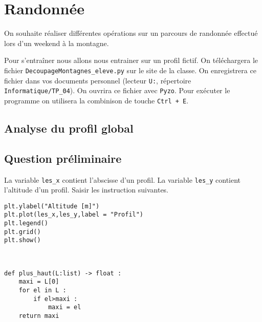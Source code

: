 \section{Randonnée}
\ifprof
\else

On souhaite réaliser différentes opérations sur un parcours de randonnée effectué lors d'un weekend  à la montagne. 

Pour s'entraîner nous allons nous entrainer sur un profil fictif.  On téléchargera le fichier \texttt{DecoupageMontagnes\_eleve.py} sur le site de la classe. On enregistrera ce fichier dans vos documents personnel (lecteur \texttt{U:}, répertoire \texttt{Informatique/TP\_04}). On ouvrira ce fichier avec \texttt{Pyzo}.
Pour exécuter le programme on utilisera la combinison de touche \texttt{Ctrl + E}.

\subsection{Analyse du profil global}



\subsection{Question préliminaire}
La variable \texttt{les\_x} contient l'abscisse d'un profil.
La variable \texttt{les\_y} contient l'altitude d'un profil. Saisir les instruction suivantes. 

\begin{lstlisting}
plt.ylabel("Altitude [m]")
plt.plot(les_x,les_y,label = "Profil")
plt.legend()
plt.grid()
plt.show()
\end{lstlisting}




\ifprof
\begin{corrige}~\\
\vspace{-.5cm}
\begin{lstlisting}
def plus_haut(L:list) -> float :
    maxi = L[0]
    for el in L : 
        if el>maxi :
            maxi = el  
    return maxi
\end{lstlisting}
\end{corrige}
\else
\fi



